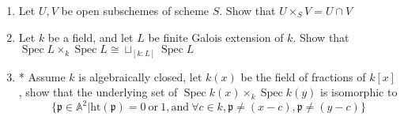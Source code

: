 \documentclass[a4paper,11pt]{article}
\def\bb#1{\mathbb{#1}}
\def\mrm#1{\mathrm{#1}}
\DeclareMathOperator{\Spec}{Spec}
\begin{document}
\begin{enumerate}[1.]
\begin{enumerate}
    \item Let $U,V$ be open subschemes of scheme $S$. Show that $U\times_S V=U\cap V$
    \item Let $k$ be a field, and let $L$ be finite Galois extension of $k$. Show that $\Spec L \times_k \Spec L \cong \sqcup_{[k:L]}\Spec L$
    \item* Assume $k$ is algebraically closed, let $k(x)$ be the field of fractions of $k[x]$, show that the underlying set of
    $\Spec k(x) \times_k \Spec k(y)$ is isomorphic to
    \[ \{\mathfrak{p}\in\bb{A}^2| \mathrm{ht}(\mathfrak{p})=0\ \mathrm{or}\ 1,\mrm{and\ }\forall c\in k, \mathfrak{p}\neq (x-c),\mathfrak{p}\neq(y-c)\}\]
\end{enumerate}

\begin{comment}
\item Let $A\to B$ be a integral extension, and let $\mathfrak{p}$ be a prime ideal of $B$
\begin{enumerate}
    \item Show that for any prime ideal $\mathfrak{q}$ of $B$ such that $\mathfrak{p}\cap A\subset\mathfrak{q}\subset \mathfrak{p}$, then $\mathfrak{q}= \mathfrak{p}$
    \item* Use induction to show that $\mathrm{ht}(\mathfrak{p}\subset B)=\mathrm{ht}(\mathfrak{p}\cap A\subset A)$
\end{enumerate}
\end{comment}

\end{enumerate}
\end{document}
